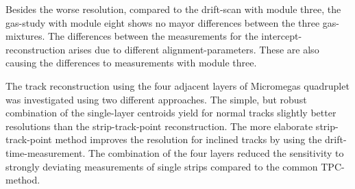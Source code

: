 \documentclass[
twoside,            %
BCOR1.4cm,          %
10pt,               %
headings=normal,    %
headsepline,        %
clearplainpage,		%
final,              %
div=14,
open=right,
bibliography=toc
]{scrreprt}
\begin{document}
Besides the worse resolution, compared to the drift-scan with module three, the gas-study with module eight shows no mayor differences between the three gas-mixtures.
The differences between the measurements for the intercept-reconstruction arises due to different alignment-parameters.
These are also causing the differences to measurements with module three.

The track reconstruction using the four adjacent layers of Micromegas quadruplet was investigated using two different approaches.
The simple, but robust combination of the single-layer centroids yield for normal tracks slightly better resolutions than the strip-track-point reconstruction.
The more elaborate strip-track-point method improves the resolution for inclined tracks by using the drift-time-measurement.
The combination of the four layers reduced the sensitivity to strongly deviating measurements of single strips compared to the common \textmu TPC-method.
\end{document}
